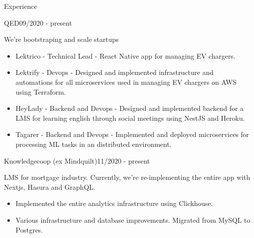 \documentclass{resume}
\begin{document}
\begin{rSection}{Experience}

    \begin{rSubsection}{QED}{09/2020 - present}{}{}
      \item We're bootstraping and scale startups
        \begin{itemize}
            \setlength\itemsep{-0.3em}
            \item Lektrico - Technical Lead - React Native app for managing EV chargers.
            \item Lektrify - Devops - Designed and implemented infrastructure and automations for all microservices used in managing EV chargers on AWS using Terraform.
            \item HeyLady - Backend and Devops - Designed and implemented backend for a LMS for learning english through social meetings using NestJS and Heroku.
            \item Tagarer - Backend and Devops - Implemented and deployed microservices for processing ML tasks in an distributed environment.
        \end{itemize}
    \end{rSubsection}

    \begin{rSubsection}{Knowledgecoop (ex Mindquilt)}{11/2020 - present}{}{}
        \item LMS for mortgage industry. Currently, we're re-implementing the entire app with Nextjs, Hasura and GraphQL.
        \begin{itemize}
            \setlength\itemsep{-0.3em}
            \item Implemented the entire analytics infrastructure using Clickhouse.
            \item Various infrastructure and database improvements. Migrated from MySQL to Postgres.
        \end{itemize}
    \end{rSubsection}


\end{rSection}
\end{document}
